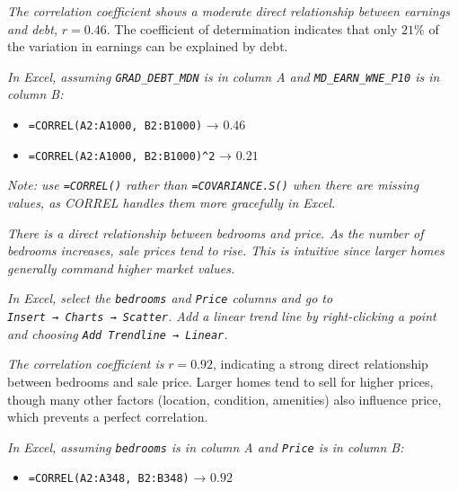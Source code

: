 \documentclass[
  11pt,
  letterpaper,
  DIV=11,
  numbers=noendperiod,
  oneside,
  open=any]{scrreprt}
\providecommand{\tightlist}{%
  \setlength{\itemsep}{0pt}\setlength{\parskip}{0pt}}\usepackage{longtable,booktabs,array}
\newenvironment{bsanswerkey}[2]{%
  \begin{tcolorbox}[bsbase, colback=bspaper2, colframe=bsline, fontupper=\small,
    title={\hypertarget{a-#1}{}\label{a-#1}\hyperlink{q-#1}{\textcolor{bsink2}{\MakeUppercase{#2}}}\hfill
      \hyperlink{q-#1}{\textcolor{bsaccent}{\normalfont\footnotesize back to page \pageref{q-#1}}}}]}%
  {\end{tcolorbox}}
\begin{document}
\begin{bsanswerkey}{bsans55}{Exercise 3, question 2}

\emph{The correlation coefficient shows a moderate direct relationship
between earnings and debt,} \(r = 0.46\). The coefficient of
determination indicates that only \(21\%\) of the variation in earnings
can be explained by debt.

\emph{In Excel, assuming \texttt{GRAD\_DEBT\_MDN} is in column A and
\texttt{MD\_EARN\_WNE\_P10} is in column B:}

\begin{itemize}
\tightlist
\item
  \texttt{=CORREL(A2:A1000,\ B2:B1000)} → \(0.46\)
\item
  \texttt{=CORREL(A2:A1000,\ B2:B1000)\^{}2} → \(0.21\)
\end{itemize}

\emph{Note: use \texttt{=CORREL()} rather than \texttt{=COVARIANCE.S()}
when there are missing values, as CORREL handles them more gracefully in
Excel.}

\end{bsanswerkey}

\begin{bsanswerkey}{bsans56}{Exercise 4, question 1}

\emph{There is a direct relationship between bedrooms and price. As the
number of bedrooms increases, sale prices tend to rise. This is
intuitive since larger homes generally command higher market values.}

\emph{In Excel, select the \texttt{bedrooms} and \texttt{Price} columns
and go to \texttt{Insert\ →\ Charts\ →\ Scatter}. Add a linear trend
line by right-clicking a point and choosing
\texttt{Add\ Trendline\ →\ Linear}.}

\end{bsanswerkey}

\begin{bsanswerkey}{bsans57}{Exercise 4, question 2}

\emph{The correlation coefficient is} \(r = 0.92\), indicating a strong
direct relationship between bedrooms and sale price. Larger homes tend
to sell for higher prices, though many other factors (location,
condition, amenities) also influence price, which prevents a perfect
correlation.

\emph{In Excel, assuming \texttt{bedrooms} is in column A and
\texttt{Price} is in column B:}

\begin{itemize}
\tightlist
\item
  \texttt{=CORREL(A2:A348,\ B2:B348)} → \(0.92\)
\end{itemize}

\end{bsanswerkey}
\end{document}
